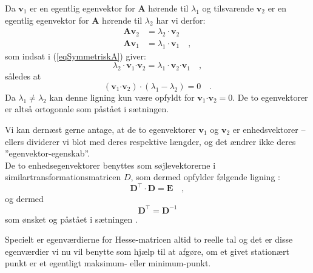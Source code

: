 \begin{bevis}
Da $\mathbf{v}_{1}$ er en egentlig egenvektor for $\mathbf{A}$ hørende til $\lambda_{1}$ og tilsvarende $\mathbf{v}_{2}$ er en egentlig egenvektor for $\mathbf{A}$ hørende til $\lambda_{2}$ har vi derfor:
\begin{equation}
\begin{aligned}
\mathbf{A} \mathbf{v}_{2} &= \lambda_{2} \cdot \mathbf{v}_{2} \\
\mathbf{A} \mathbf{v}_{1} &= \lambda_{1} \cdot \mathbf{v}_{1} \quad ,
\end{aligned}
\end{equation}
som indsat i (\ref{eqSymmetriskA}) giver:
\begin{equation}
\lambda_{2} \cdot \mathbf{v}_{1}\bm{\cdot} \mathbf{v}_{2} = \lambda_{1} \cdot \mathbf{v}_{2}\bm{\cdot} \mathbf{v}_{1} \quad ,
\end{equation}
således at
\begin{equation}
 (\mathbf{v}_{1}\bm{\cdot} \mathbf{v}_{2})\cdot(\lambda_{1} - \lambda_{2}) = 0 \quad .
\end{equation}
Da $\lambda_{1} \neq \lambda_{2}$  kan denne ligning kun være opfyldt for $\mathbf{v}_{1}\bm{\cdot} \mathbf{v}_{2} = 0$.
De to egenvektorer er altså ortogonale som påstået i sætningen.

Vi kan dernæst gerne antage, at de to egenvektorer $\mathbf{v}_{1}$ og $\mathbf{v}_{2}$ er enhedsvektorer -- ellers dividerer vi blot med deres respektive længder, og det ændrer ikke deres ''egenvektor-egenskab''.  \\

De to enhedsegenvektorer benyttes som søjlevektorerne i similartransformationsmatricen $D$, som dermed opfylder følgende ligning :
\begin{equation}
\mathbf{D}^{\top}\cdot \mathbf{D} = \mathbf{E} \quad  ,
\end{equation}
og dermed
\begin{equation}
\mathbf{D}^{\top} = \mathbf{D}^{-1}
\end{equation}
som ønsket og påstået i sætningen .

\end{bevis}

Specielt er egenværdierne for Hesse-matricen altid to reelle tal og det er disse egenværdier vi nu vil benytte som hjælp til at afgøre, om et givet stationært punkt er et egentligt maksimum- eller minimum-punkt.

